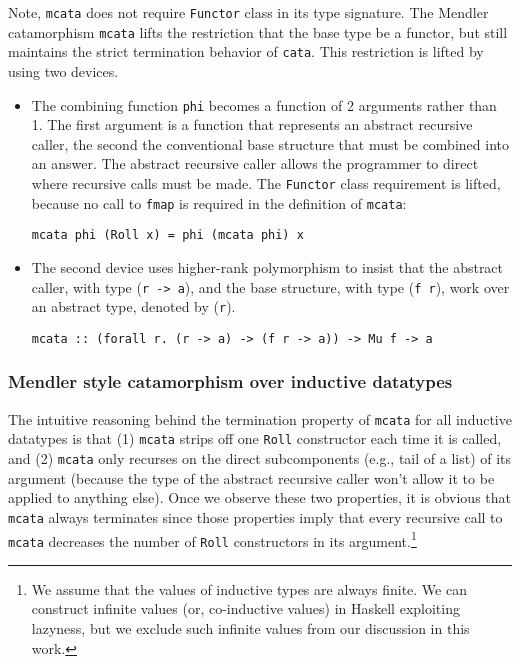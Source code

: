 Note, \verb|mcata| does not require \verb|Functor| class in its type signature.
The Mendler catamorphism \verb|mcata| lifts the restriction that the
base type be a functor, but still maintains the strict termination
behavior of \verb|cata|. This restriction is lifted by using two devices.
\begin{itemize}
  \item The combining function \verb|phi| becomes a function of 2 arguments
        rather than 1. The first argument is a function that represents an
        abstract recursive caller, the second the conventional base structure
        that must be combined into an answer. The abstract recursive caller
        allows the programmer to direct where recursive calls must be made.
        The \verb|Functor| class requirement is lifted,
        because no call to \verb|fmap|
        is required in the definition of \verb|mcata|:
\begin{verbatim}
mcata phi (Roll x) = phi (mcata phi) x
\end{verbatim}
  \item The second device uses higher-rank polymorphism to insist that
        the abstract caller, with type (\verb|r -> a|), and
        the base structure, with type (\verb|f r|),
        work over an abstract type, denoted by (\verb|r|). 
\begin{verbatim}
mcata :: (forall r. (r -> a) -> (f r -> a)) -> Mu f -> a
\end{verbatim}
\end{itemize}

\subsubsection{Mendler style catamorphism over inductive datatypes}

The intuitive reasoning behind the termination property of \verb|mcata| for
all inductive datatypes is that (1) \verb|mcata| strips off one \verb|Roll|
constructor each time it is called, and (2) \verb|mcata| only recurses on the
direct subcomponents (e.g., tail of a list) of its argument (because the type
of the abstract recursive caller won't allow it to be applied to anything else).
Once we observe these two properties, it is obvious that \verb|mcata| always
terminates since those properties imply that every recursive call to \verb|mcata|
decreases the number of \verb|Roll| constructors in its argument.\footnote{We assume
that the values of inductive types are always finite. We can construct infinite
values (or, co-inductive values) in Haskell exploiting lazyness, but we exclude
such infinite values from our discussion in this work.}

